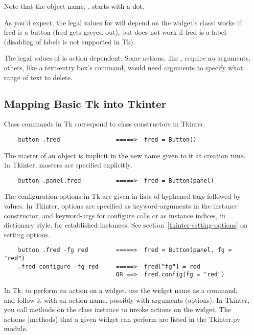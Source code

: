 Note that the object name, , starts with a dot.

As you'd expect, the legal values for  will depend on
the widget's class:  works if fred is a
button (fred gets greyed out), but does not work if fred is a label
(disabling of labels is not supported in Tk). 

The legal values of  is action dependent.  Some
actions, like , require no arguments, others, like
a text-entry box's  command, would need arguments
to specify what range of text to delete.  


\subsection{Mapping Basic Tk into Tkinter
            \label{tkinter-basic-mapping}}

Class commands in Tk correspond to class constructors in Tkinter.

\begin{verbatim}
    button .fred                =====>  fred = Button()
\end{verbatim}

The master of an object is implicit in the new name given to it at
creation time.  In Tkinter, masters are specified explicitly.

\begin{verbatim}
    button .panel.fred          =====>  fred = Button(panel)
\end{verbatim}

The configuration options in Tk are given in lists of hyphened tags
followed by values.  In Tkinter, options are specified as
keyword-arguments in the instance constructor, and keyword-args for
configure calls or as instance indices, in dictionary style, for
established instances.  See section~\ref{tkinter-setting-options} on
setting options.

\begin{verbatim}
    button .fred -fg red        =====>  fred = Button(panel, fg = "red")
    .fred configure -fg red     =====>  fred["fg"] = red
                                OR ==>  fred.config(fg = "red")
\end{verbatim}

In Tk, to perform an action on a widget, use the widget name as a
command, and follow it with an action name, possibly with arguments
(options).  In Tkinter, you call methods on the class instance to
invoke actions on the widget.  The actions (methods) that a given
widget can perform are listed in the Tkinter.py module.

